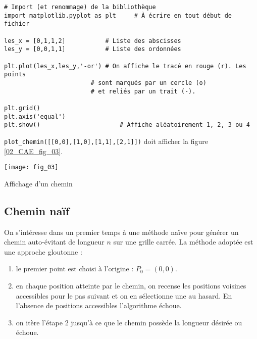 \begin{lstlisting}
# Import (et renommage) de la bibliothèque 
import matplotlib.pyplot as plt		# À écrire en tout début de fichier

les_x = [0,1,1,2]			# Liste des abscisses
les_y = [0,0,1,1]			# Liste des ordonnées

plt.plot(les_x,les_y,'-or')	# On affiche le tracé en rouge (r). Les points 
						# sont marqués par un cercle (o) 
						# et reliés par un trait (-). 

plt.grid()
plt.axis('equal')
plt.show() 						# Affiche aléatoirement 1, 2, 3 ou 4

\end{lstlisting}





\begin{test}
\lstinline{plot_chemin([[0,0],[1,0],[1,1],[2,1]])} doit afficher la figure \ref{02_CAE_fig_03}.
\end{test}


\begin{marginfigure}
\texttt{[image: fig\_03]}
\caption{Affichage d'un chemin \label{02_CAE_fig_03}}
\end{marginfigure}





\subsection*{Chemin naïf} 


On s’intéresse dans un premier temps à une méthode naïve pour générer un chemin auto-évitant de longueur
$n$ sur une grille carrée. La méthode adoptée est une approche gloutonne :
\begin{enumerate}
\item le premier point est choisi à l’origine : $P_0 = \left(0, 0\right)$.
\item en chaque position atteinte par le chemin, on recense les positions voisines accessibles pour le pas
suivant et on en sélectionne une au hasard. En l’absence de positions accessibles l’algorithme échoue.
\item on itère l’étape 2 jusqu’à ce que le chemin possède la longueur désirée ou échoue.
\end{enumerate}





